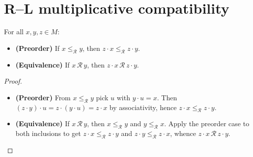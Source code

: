 \section{R--L multiplicative compatibility}

\begin{lemma}
\label{lem:left-mul-compat-right}
For all \(x,y,z\in M\):
\begin{itemize}
  \item \textbf{(Preorder)} If \(x \le_{\mathcal R} y\), then \(z\cdot x \le_{\mathcal R} z\cdot y\).
  \item \textbf{(Equivalence)} If \(x \,\mathcal R\, y\), then \(z\cdot x \,\mathcal R\, z\cdot y\).
\end{itemize}
\leanok
{}
\end{lemma}
\begin{proof}
\leanok
\begin{itemize}
  \item \textbf{(Preorder)} From \(x \le_{\mathcal R} y\) pick \(u\) with \(y\cdot u = x\). Then
        \((z\cdot y)\cdot u = z\cdot (y\cdot u) = z\cdot x\) by associativity, hence \(z\cdot x \le_{\mathcal R} z\cdot y\).
  \item \textbf{(Equivalence)} If \(x \,\mathcal R\, y\), then \(x \le_{\mathcal R} y\) and \(y \le_{\mathcal R} x\).
        Apply the preorder case to both inclusions to get \(z\cdot x \le_{\mathcal R} z\cdot y\) and \(z\cdot y \le_{\mathcal R} z\cdot x\),
        whence \(z\cdot x \,\mathcal R\, z\cdot y\).
\end{itemize}
\end{proof}


